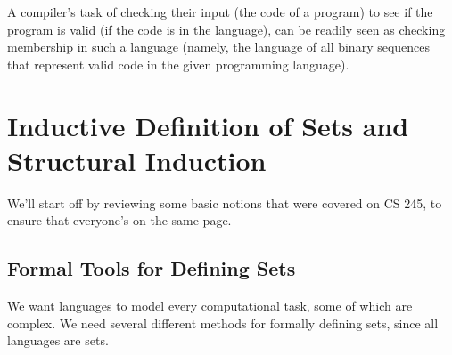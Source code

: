 \documentclass[]{article}
\theoremstyle{definition}
\begin{document}
        A compiler's task of checking their input (the code of a program) to see if the program is valid (if the code is in the language), can be readily seen as checking membership in such a language (namely, the language of all binary sequences that represent valid code in the given programming language).

  \section{Inductive Definition of Sets and Structural Induction}
    We'll start off by reviewing some basic notions that were covered on CS 245, to ensure that everyone's on the same page.
      \subsection{Formal Tools for Defining Sets}
        We want languages to model every computational task, some of which are complex. We need several different methods for formally defining sets, since all languages are sets.
\end{document}
